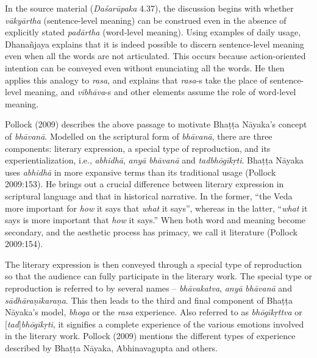 In the source material (\textsl{Daśarūpaka} 4.37), the discussion begins with whether \textsl{vākyārtha} (sentence-level meaning) can be construed even in the absence of explicitly stated \textsl{padārtha} (word-level meaning). Using examples of daily usage, Dhanañjaya explains that it is indeed possible to discern sentence-level meaning even when all the words are not articulated. This occurs because action-oriented intention can be conveyed even without enunciating all the words. He then applies this analogy to \textsl{rasa}, and explains that \textsl{rasa}-s take the place of sentence-level meaning, and \textsl{vibhāva}-s and other elements assume the role of word-level meaning.

Pollock (2009) describes the above passage to motivate Bhaṭṭa Nāyaka’s concept of \textsl{bhāvanā}. Modelled on the scriptural form of \textsl{bhāvanā}, there are three components: literary expression, a special type of reproduction, and its experientialization, i.e., \textsl{abhidhā}, \textsl{anyā} \textsl{bhāvanā} and \textsl{tadbhōgīkṛti}. Bhaṭṭa Nāyaka uses \textsl{abhidhā} in more expansive terms than its traditional usage (Pollock 2009:153). He brings out a crucial difference between literary expression in scriptural language and that in historical narrative. In the former, “the Veda
 more important for \textsl{how} it says that \textsl{what }it says”, whereas in the latter, “\textsl{what} it says is more important that \textsl{how} it says.” When both word and meaning become secondary, and the aesthetic process has primacy, we call it literature (Pollock 2009:154).

The literary expression is then conveyed through a special type of reproduction so that the audience can fully participate in the literary work. The special type or reproduction is referred to by several names -- \textsl{bhāvakatva}, \textsl{anyā} \textsl{bhāvanā} and \textsl{sādhāraṇīkaraṇa}. This then leads to the third and final component of Bhaṭṭa Nāyaka’s model, \textsl{bhoga} or the \textsl{rasa} experience. Also referred to as \textsl{bhōgīkṛttva} or [\textsl{tad}]\textsl{bhōgīkṛti}, it signifies a complete experience of the various emotions involved in the literary work. Pollock (2009) mentions the different types of experience described by Bhaṭṭa Nāyaka, Abhinavagupta and others. 

